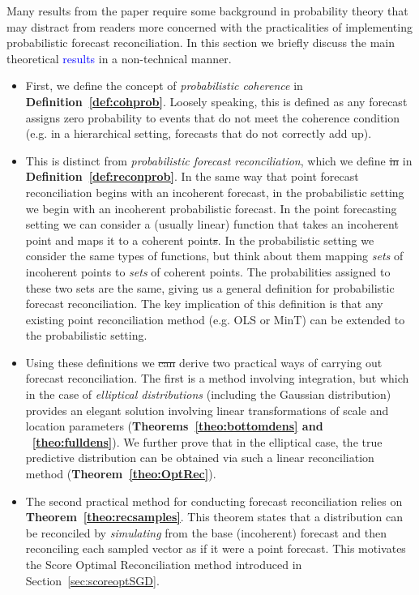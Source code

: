 \documentclass[a4paper,12pt]{article}
\theoremstyle{definition}
\begin{document}
{\color{red} Many results from the paper require some background in probability theory that may distract from readers more concerned with the practicalities of implementing probabilistic forecast reconciliation. In this section we briefly discuss the main theoretical \textcolor{blue}{results} in a non-technical manner.

\begin{itemize}
	\item First, we define the concept of \textit{probabilistic coherence} in \textbf{Definition~\ref{def:cohprob}}. Loosely speaking, this is defined as any forecast assigns zero probability to events that do not meet the coherence condition (e.g. in a hierarchical setting, forecasts that do not correctly add up).
	\item This is distinct from \textit{probabilistic forecast reconciliation}, which we define \sout{in} in \textbf{Definition~\ref{def:reconprob}}. In the same way that point forecast reconciliation begins with an incoherent forecast, in the probabilistic setting we begin with an incoherent probabilistic forecast. In the point forecasting setting we can consider a (usually linear) function that takes an incoherent point and maps it to a coherent point\sout{s}. In the probabilistic setting we consider the same types of functions, but think about them mapping \textit{sets} of incoherent points to \textit{sets} of coherent points. The probabilities assigned to these two sets are the same, giving us a general definition for probabilistic forecast reconciliation. The key implication of this definition is that any existing point reconciliation method (e.g. OLS or MinT) can be extended to the probabilistic setting.
	\item Using these definitions we \sout{can} derive two practical ways of carrying out forecast reconciliation. The first is a method involving integration, but which in the case of \textit{elliptical distributions} (including the Gaussian distribution) provides an elegant solution involving linear transformations of scale and location parameters (\textbf{Theorems~\ref{theo:bottomdens} and ~\ref{theo:fulldens}}). We further prove that in the elliptical case, the true predictive distribution can be obtained via such a linear reconciliation method (\textbf{Theorem~\ref{theo:OptRec}}).
	\item  The second practical method for conducting forecast reconciliation relies on \textbf{Theorem~\ref{theo:recsamples}}. This theorem states that a distribution can be reconciled by \textit{simulating} from the base (incoherent) forecast and then reconciling each sampled vector as if it were a point forecast. This motivates the Score Optimal Reconciliation method introduced in Section~{\ref{sec:scoreoptSGD}}.

\end{itemize}}
\end{document}
